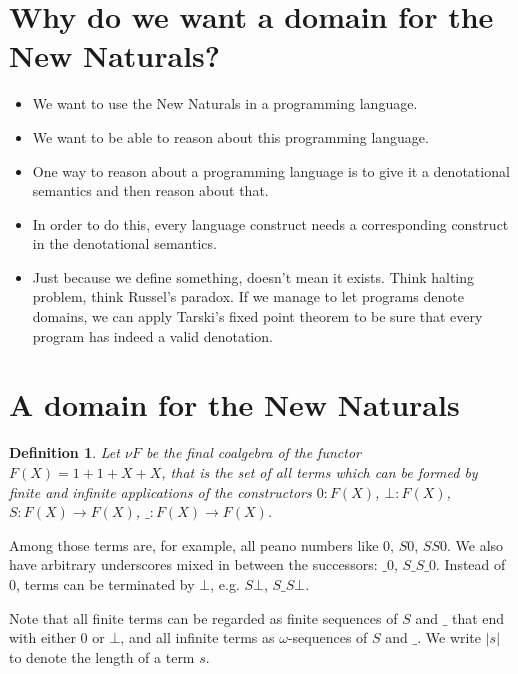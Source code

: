 \documentclass[a4paper]{article}
\newcommand{\arr}{\rightarrow}
\newtheorem{defNuF}{Definition}[section]
\begin{document}
\section{Why do we want a domain for the New Naturals?}

\begin{itemize}

\item We want to use the New Naturals in a programming language.

\item We want to be able to reason about this programming language.

\item One way to reason about a programming language is to give it a
denotational semantics and then reason about that.

\item In order to do this, every language construct needs a corresponding
construct in the denotational semantics.

\item Just because we define something, doesn't mean it exists.  Think halting
problem, think Russel's paradox. If we manage to let programs denote domains,
we can apply Tarski's fixed point theorem to be sure that every program has
indeed a valid denotation.

\end{itemize}

\section{A domain for the New Naturals}

\begin{defNuF}

Let $\nu F$ be the final coalgebra of the functor $F(X) = 1 + 1 + X + X$, that
is the set of all terms which can be formed by finite and infinite applications
of the constructors $0:F(X)$, $\bot:F(X)$, $S:F(X) \arr F(X)$, $\_:F(X) \arr
F(X)$.

\end{defNuF}


Among those terms are, for example, all peano numbers like $0$, $S0$, $SS0$.
We also have arbitrary underscores mixed in between the successors: $\_0$,
$S\_S\_0$.  Instead of $0$, terms can be terminated by $\bot$, e.g.  $S\bot$,
$S\_S\bot$.

Note that all finite terms can be regarded as finite sequences of $S$ and $\_$
that end with either $0$ or $\bot$, and all infinite terms as
$\omega$-sequences of $S$ and $\_$.  We write $|s|$ to denote the length of a
term $s$.
\end{document}
